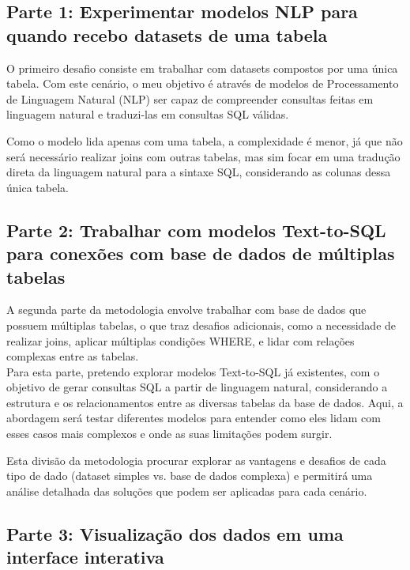 \documentclass{article}
\begin{document}
\subsection{Parte 1: Experimentar modelos NLP para quando recebo datasets de uma tabela} 

\hspace*{1em} O primeiro desafio consiste em trabalhar com datasets compostos por uma única tabela. Com este cenário, o meu objetivo é através de modelos de Processamento de Linguagem Natural (NLP) ser capaz de compreender consultas feitas em linguagem natural e traduzi-las em consultas SQL válidas. 

 Como o modelo lida apenas com uma tabela, a complexidade é menor, já que não será necessário realizar joins com outras tabelas, mas sim focar em uma tradução direta da linguagem natural para a sintaxe SQL, considerando as colunas dessa única tabela.

\subsection{Parte 2: Trabalhar com modelos Text-to-SQL para conexões com base de dados de múltiplas tabelas} 

\hspace*{1em} A segunda parte da metodologia envolve trabalhar com base de dados que possuem múltiplas tabelas, o que traz desafios adicionais, como a necessidade de realizar joins, aplicar múltiplas condições WHERE, e lidar com relações complexas entre as tabelas.\\ \hspace*{1em} Para esta parte, pretendo explorar modelos Text-to-SQL já existentes, com o objetivo de gerar consultas SQL a partir de linguagem natural, considerando a estrutura e os relacionamentos entre as diversas tabelas da base de dados. Aqui, a abordagem será testar diferentes modelos para entender como eles lidam com esses casos mais complexos e onde as suas limitações podem surgir.

Esta divisão da metodologia procurar explorar as vantagens e desafios de cada tipo de dado (dataset simples vs. base de dados complexa) e permitirá uma análise detalhada das soluções que podem ser aplicadas para cada cenário.

\subsection{Parte 3: Visualização dos dados em uma interface interativa} 
\end{document}
